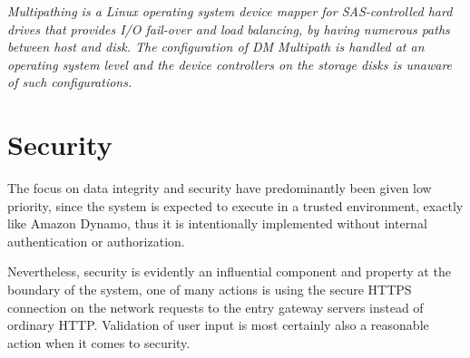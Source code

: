\begin{definition}[DM Multipath] \label{def:multipath}
\textit{Multipathing is a Linux operating system device mapper for SAS-controlled hard drives that provides I/O fail-over and load balancing, by having numerous paths between host and disk. The configuration of DM Multipath is handled at an operating system level and the device controllers on the storage disks is unaware of such configurations.}
\end{definition}

\section{Security} \label{sec:security}
The focus on data integrity and security have predominantly been given low priority, since the system is expected to execute in a trusted environment, exactly like Amazon Dynamo, thus it is intentionally implemented without internal authentication or authorization.
\newline

Nevertheless, security is evidently an influential component and property at the boundary of the system, one of many actions is \eg using the secure HTTPS connection on the network requests to the entry gateway servers instead of ordinary HTTP. Validation of user input is most certainly also a reasonable action when it comes to security.
